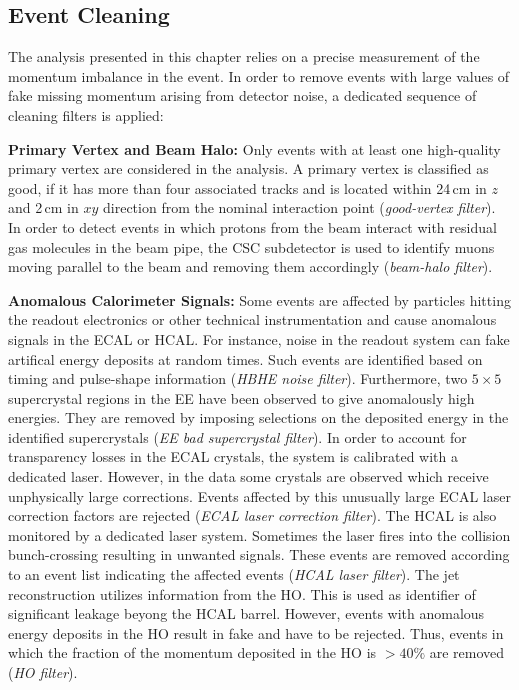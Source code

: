 \subsection{Event Cleaning}
\label{subsec:RA2_cleaning}
The analysis presented in this chapter relies on a precise measurement of the momentum imbalance in the event. In order to remove events with large values of fake missing momentum arising from detector noise, a dedicated sequence of cleaning filters is applied: 
\begin{description}
 \item{\textbf{Primary Vertex and Beam Halo:}} Only events with at least one high-quality primary vertex are considered in the analysis. A primary vertex is classified as good, if it has more than four associated tracks and is located within 24\,cm in $z$ and 2\,cm in $xy$ direction from the nominal interaction point (\textit{good-vertex filter}). In order to detect events in which protons from the beam interact with residual gas molecules in the beam pipe, the CSC subdetector is used to identify muons moving parallel to the beam and removing them accordingly (\textit{beam-halo filter}).
 \item{\textbf{Anomalous Calorimeter Signals:}} Some events are affected by particles hitting the readout electronics or other technical instrumentation and cause anomalous signals in the ECAL or HCAL. For instance, noise in the readout system can fake artifical energy deposits at random times. Such events are identified based on timing and pulse-shape information (\textit{HBHE noise filter}). Furthermore, two $5 \times 5 $ supercrystal regions in the EE have been observed to give anomalously high energies. They are removed by imposing selections on the deposited energy in the identified supercrystals (\textit{EE bad supercrystal filter}). In order to account for transparency losses in the ECAL crystals, the system is calibrated with a dedicated laser. However, in the data some crystals are observed which receive unphysically large corrections. Events affected by this unusually large ECAL laser correction factors are rejected (\textit{ECAL laser correction filter}). The HCAL is also monitored by a dedicated laser system. Sometimes the laser fires into the collision bunch-crossing resulting in unwanted signals. These events are removed according to an event list indicating the affected events (\textit{HCAL laser filter}). The jet reconstruction utilizes information from the HO. This is used as identifier of significant leakage beyong the HCAL barrel. However, events with anomalous energy deposits in the HO result in fake \MHT and have to be rejected. Thus, events in which the fraction of the momentum deposited in the HO is $> 40\%$ are removed (\textit{HO filter}).

\end{description}
